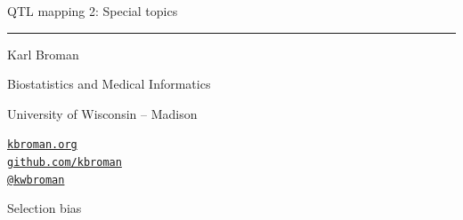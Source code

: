 \documentclass[12pt]{article}
\newcommand{\titlesize}{\fontsize{40}{50} \selectfont}
\newcommand{\headsize}{\fontsize{35}{35} \selectfont}
\newcommand{\textsize}{\fontsize{30}{35} \selectfont}
\newcommand{\smallsize}{\fontsize{25}{30} \selectfont}
\begin{document}
\thispagestyle{empty}

\begin{center}
\titlesize \color{myyellow}


\vspace*{15mm}

QTL mapping 2: Special topics

\color{mypink}
\rule{10in}{1mm}

\vspace{5mm}

\textsize \color{myblue}
Karl Broman
\vspace{5mm}

\color{mywhite}
{\smallsize Biostatistics and Medical Informatics

University of Wisconsin -- Madison
\vspace{20mm}


\href{http://kbroman.org}{\tt kbroman.org} \\[3pt]
\href{https://github.com/kbroman}{\tt github.com/kbroman} \\
\href{https://twitter.com/kwbroman}{\tt @kwbroman}
}

\end{center}


\newpage

\headsize \color{myyellow}
\hfill \begin{minipage}{5.75in}
\centering
Selection bias
\end{minipage}

\vspace{15mm}

\color{mywhite} \smallsize
\end{document}
